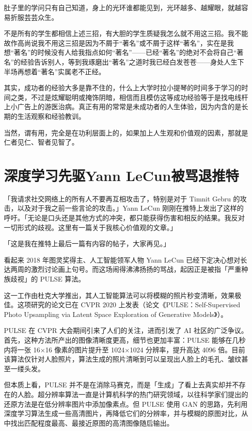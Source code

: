肚子里的学问只有自己知道，身上的光环谁都能见到，光环越多、越耀眼，就越容易折服芸芸众生。




不是所有的学生都相信上述三招，有大胆的学生质疑我怎么就不用这三招。我不能故作高尚说我不用这三招是因为不屑于“著名”或不屑于这样“著名”，实在是我想“著名”的时候没有人给我指点如何“著名”——已经“著名”的绝对不会将自己“著名”的经验告诉别人，等到我琢磨出“著名”之道时我已经白发苍苍——身处人生下半场再想着“著名”实属老不正经。

其实，成功者的经验大多是靠不住的，什么上大学时拉小提琴的时间多于学习的时间之类，不过是炫耀聪明或掩饰阴暗，相信而且模仿这等成功经验等于是找电线杆上小广告上的游医治病。真正有用的常常是未成功者的人生体验，因为内含的是长期的生活观察和经验教训。

当然，谓有用，完全是在功利层面上的，如果加上人生观和价值观的因素，那就是仁者见仁、智者见智了。


\section{深度学习先驱Yann LeCun被骂退推特}

「我请求社交网络上的所有人不要再互相攻击了，特别是对于 Timnit Gebru 的攻击，以及对于我之前一些言论的攻击。」Yann LeCun 刚刚在推特上发出了这样的呼吁。「无论是口头还是其他方式的冲突，都只能获得伤害和相反的结果。我反对一切形式的歧视。这里有一篇关于我核心价值观的文章。」

「这是我在推特上最后一篇有内容的帖子，大家再见。」




看起来 2018 年图灵奖得主、人工智能领军人物 Yann LeCun 已经下定决心想对长达两周的激烈讨论画上句号。而这场闹得沸沸扬扬的骂战，起因正是被指「严重种族歧视」的 PULSE 算法。

这一工作由杜克大学推出，其人工智能算法可以将模糊的照片秒变清晰，效果极佳。这项研究的论文已在 CVPR 2020 上发表（论文《PULSE：Self-Supervised Photo Upsampling via Latent Space Exploration of Generative Models》）。




PULSE 在 CVPR 大会期间引来了人们的关注，进而引发了 AI 社区的广泛争议。首先，这种方法所产出的图像清晰度更高，细节也更加丰富：PULSE 能够在几秒内将一张 16×16 像素的图片提升至 1024×1024 分辨率，提升高达 4096 倍。目前该算法仅针对人脸照片，算法生成的照片清晰到可以呈现出人脸上的毛孔、皱纹甚至一缕头发。

但本质上看，PULSE 并不是在消除马赛克，而是「生成」了看上去真实却并不存在的人脸。超分辨率算法一直是计算机科学的热门研究领域，以往科学家们提出的还原方法是在低分辨率图片中添加像素点。但 PULSE 使用 GAN 的思路，先利用深度学习算法生成一些高清图片，再降低它们的分辨率，并与模糊的原图对比，从中找出匹配程度最高、最接近原图的高清图像随后输出。

